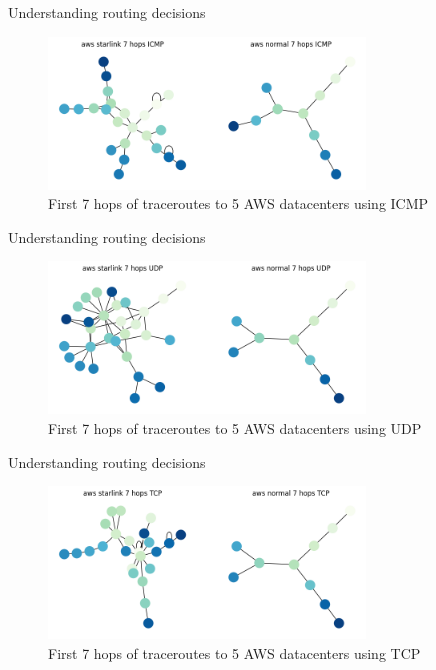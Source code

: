 \documentclass[NET,english,beameralt]{tumbeamer}
\begin{document}
\begin{frame}{Understanding routing decisions}
\begin{figure}
    \includegraphics[width=0.75\textwidth]{pics/aws_7_icmp.png}
    \caption[short]{First 7 hops of traceroutes to 5 AWS datacenters using ICMP}
\end{figure}
\end{frame}

\begin{frame}{Understanding routing decisions}
\begin{figure}
    \includegraphics[width=0.75\textwidth]{pics/aws_7_udp.png}
    \caption[short]{First 7 hops of traceroutes to 5 AWS datacenters using UDP}
\end{figure}
\end{frame}

\begin{frame}{Understanding routing decisions}
\begin{figure}
    \includegraphics[width=0.75\textwidth]{pics/aws_7_tcp.png}
    \caption[short]{First 7 hops of traceroutes to 5 AWS datacenters using TCP}
\end{figure}
\end{frame}
\end{document}
